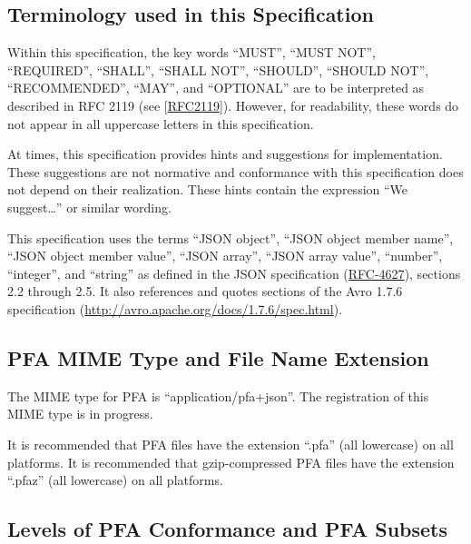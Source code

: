\documentclass{article}
\begin{document}
\subsection{Terminology used in this Specification}

Within this specification, the key words ``MUST'', ``MUST NOT'', ``REQUIRED'', ``SHALL'', ``SHALL NOT'', ``SHOULD'', ``SHOULD NOT'', ``RECOMMENDED'', ``MAY'', and ``OPTIONAL'' are to be interpreted as described in RFC 2119 (see [\href{http://www.ietf.org/rfc/rfc2119.txt}{RFC2119}]).  However, for readability, these words do not appear in all uppercase letters in this specification.

At times, this specification provides hints and suggestions for implementation.  These suggestions are not normative and conformance with this specification does not depend on their realization.  These hints contain the expression ``We suggest\ldots'' or similar wording.

This specification uses the terms ``JSON object'', ``JSON object member name'', ``JSON object member value'', ``JSON array'', ``JSON array value'', ``number'', ``integer'', and ``string'' as defined in the JSON specification (\href{http://tools.ietf.org/html/rfc4627}{RFC-4627}), sections 2.2 through 2.5.  It also references and quotes sections of the Avro 1.7.6 specification (\url{http://avro.apache.org/docs/1.7.6/spec.html}).

\subsection{PFA MIME Type and File Name Extension}

The MIME type for PFA is ``application/pfa+json''.  The registration of this MIME type is in progress.

It is recommended that PFA files have the extension ``.pfa'' (all lowercase) on all platforms.  It is recommended that gzip-compressed PFA files have the extension ``.pfaz'' (all lowercase) on all platforms.

\subsection{Levels of PFA Conformance and PFA Subsets}
\end{document}
